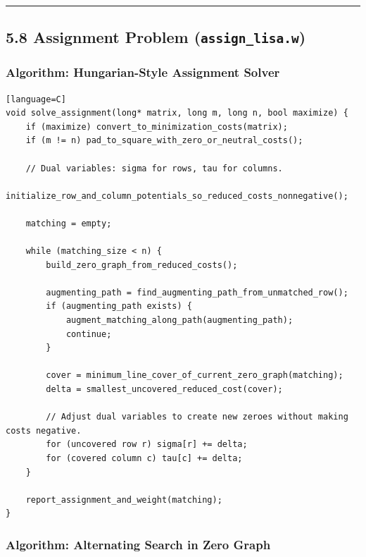 \documentclass[11pt]{article}
\begin{document}
\begin{center}\rule{0.5\linewidth}{0.5pt}\end{center}

\subsection{\texorpdfstring{5.8 Assignment Problem (\texttt{assign\_lisa.w})}{5.8 Assignment Problem (assign\_lisa.w)}}\label{assignment-problem-assign_lisa.w}

\subsubsection{Algorithm: Hungarian-Style Assignment Solver}\label{algorithm-hungarian-style-assignment-solver}

\begin{verbatim}[language=C]
void solve_assignment(long* matrix, long m, long n, bool maximize) {
    if (maximize) convert_to_minimization_costs(matrix);
    if (m != n) pad_to_square_with_zero_or_neutral_costs();

    // Dual variables: sigma for rows, tau for columns.
    initialize_row_and_column_potentials_so_reduced_costs_nonnegative();

    matching = empty;

    while (matching_size < n) {
        build_zero_graph_from_reduced_costs();

        augmenting_path = find_augmenting_path_from_unmatched_row();
        if (augmenting_path exists) {
            augment_matching_along_path(augmenting_path);
            continue;
        }

        cover = minimum_line_cover_of_current_zero_graph(matching);
        delta = smallest_uncovered_reduced_cost(cover);

        // Adjust dual variables to create new zeroes without making costs negative.
        for (uncovered row r) sigma[r] += delta;
        for (covered column c) tau[c] += delta;
    }

    report_assignment_and_weight(matching);
}
\end{verbatim}

\subsubsection{Algorithm: Alternating Search in Zero Graph}\label{algorithm-alternating-search-in-zero-graph}
\end{document}
